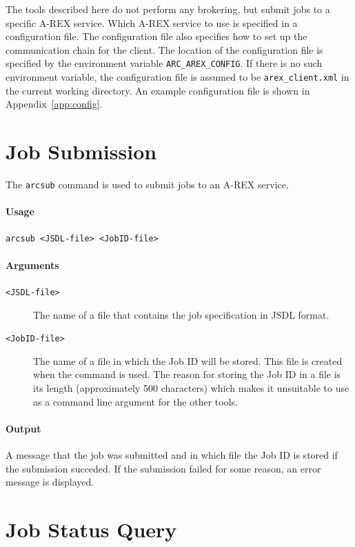 \documentclass{article}                            %
\begin{document}
The tools described here do not perform any brokering, but submit jobs
to a specific A-REX service. Which A-REX service to use is specified
in a configuration file. The configuration file also specifies how to
set up the communication chain for the client. The location of the
configuration file is specified by the environment variable
\verb:ARC_AREX_CONFIG:. If there is no such environment variable, the
configuration file is assumed to be \verb:arex_client.xml: in the
current working directory. An example configuration file is shown in
Appendix~\ref{app:config}.


\section{Job Submission}
\label{sec:arcsub}

The \verb#arcsub# command is used to submit jobs to an A-REX service.

\begin{shaded}
\paragraph{Usage} \verb:arcsub <JSDL-file> <JobID-file>:
\end{shaded}

\paragraph{Arguments}
\begin{description}
\item[\texttt{<JSDL-file>}] The name of a file that contains
the job specification in JSDL format.
\item[\texttt{<JobID-file>}] The name of a file in which the
Job ID will be stored. This file is created when the command is
used. The reason for storing the Job ID in a file is its length
(approximately 500 characters) which makes it unsuitable to use as a
command line argument for the other tools.
\end{description}

\paragraph{Output} A message that the job was submitted and in which
file the Job ID is stored if the submission succeded. If the
submission failed for some reason, an error message is displayed.


\section{Job Status Query}
\label{sec:arcstat}
\end{document}
